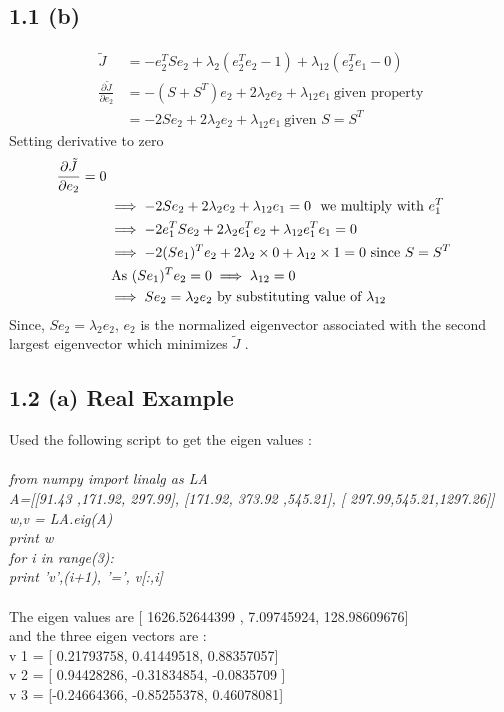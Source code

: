 \documentclass[10pt,letterpaper]{article}
\begin{document}
\subsection{1.1 (b)}
\begin{align*}
		\tilde{J} &= -e_2^TSe_2 + \lambda_2(e_2^Te_2-1)+\lambda_{12}(e_2^Te_1-0)\\
		\frac{\partial \tilde{J}}{\partial e_2} &= -(S+S^T)e_2 + 2 \lambda_2 e_2 + \lambda_{12}e_1\ \text{given property}\\
		&=-2Se_2+2\lambda_2e_2+\lambda_{12}e_1\ \text{given $S=S^T$}
\end{align*}
		Setting derivative to zero
\begin{align*}
\frac{\partial \tilde{J}}{\partial e_2} = 0\\
			&\implies -2Se_2+2\lambda_2e_2+\lambda_{12}e_1 = 0  \ \text{ we multiply with $e_1^T$}\\
			&\implies -2e_1^TSe_2+2\lambda_2 e_1^Te_2 + \lambda_{12} e_1^Te_1 = 0\\
			&\implies -2(Se_1)^Te_2+ 2 \lambda_2\times 0 + \lambda_{12} \times 1 = 0\ \text{since $S=S^T$}\\
			&  \ \text{As $ (Se_1)^Te_2 = 0$} \implies \lambda_{12} = 0\\
			&\implies Se_2 = \lambda_2e_2   \ \text{by substituting value of $\lambda_{12}$} 
\end{align*}
		Since,  $Se_2 = \lambda_2 e_2$, $e_2$  is the normalized eigenvector associated with the  second largest eigenvector which minimizes $\tilde{J}$ .
\subsection{1.2 (a) Real Example} 
Used the following script to get the eigen values :\\\\
	\textit{
	from numpy import linalg as LA\\
	A=[[91.43 ,171.92, 297.99], [171.92, 373.92 ,545.21], [ 297.99,545.21,1297.26]]\\
	w,v = LA.eig(A)\\
	print w\\
	for i in range(3):\\
    		print 'v',(i+1), '=', v[:,i]
	}\\\\
The eigen values are [ 1626.52644399 ,    7.09745924,   128.98609676]\\
and the three eigen vectors are :\\
v 1 = [ 0.21793758, 0.41449518,  0.88357057] \\
v 2 = [ 0.94428286, -0.31834854, -0.0835709 ] \\
v 3 = [-0.24664366, -0.85255378,  0.46078081]
\end{document}

